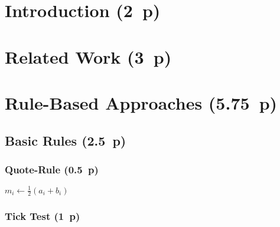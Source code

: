 \section{Introduction (2~p)}\label{introduction}

\section{Related Work (3~p)}\label{related-work}

\section{Rule-Based Approaches (5.75~p)}\label{rule-based-approaches}

\subsection{Basic Rules (2.5~p)}\label{basic-rules}

\subsubsection{Quote-Rule (0.5~p)}\label{quote-rule}

\begin{algorithm}


  \caption{$\operatorname{\mathtt{quote}}$ \label{alg:quote-rule}}


  \BlankLine %

  $m_i \leftarrow \frac{1}{2}(a_i + b_i)$ 

  \uElse{%
    \Return
  }
\end{algorithm}




\subsubsection{Tick Test (1~p)}\label{tick-test}



